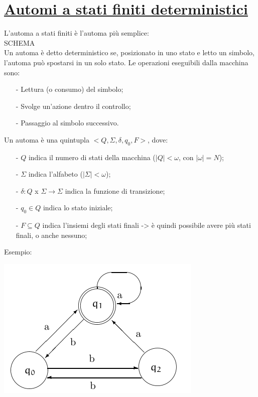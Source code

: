 \documentclass[a4paper, 10pt]{report}
\begin{document}
\section*{\underline{Automi a stati finiti deterministici}}
L'automa a stati finiti è l'automa più semplice:\\

SCHEMA\\

\noindent Un automa è detto deterministico se, posizionato in uno stato e letto un simbolo, l'automa può spostarsi in un solo stato. 
Le operazioni eseguibili dalla macchina sono:
\begin{itemize}
\item[-] Lettura (o consumo) del simbolo;
\item[-] Svolge un'azione dentro il controllo;
\item[-] Passaggio al simbolo successivo. 
\end{itemize}

\noindent Un automa è una quintupla $<Q, \Sigma, \delta, q_0, F>$, dove:
\begin{itemize}
\item[-] $Q$ indica il numero di stati della macchina ($|Q| < \omega$, con $|\omega| = N$);
\item[-] $\Sigma$ indica l'alfabeto ($ |\Sigma| < \omega$);
\item[-] $\delta: Q$ x $\Sigma \rightarrow \Sigma$ indica la funzione di transizione;
\item[-] $q_0 \in Q$ indica lo stato iniziale;
\item[-] $F \subseteq Q$ indica l'insiemi degli stati finali -> è quindi possibile avere più stati finali, o anche nessuno;
\end{itemize}

\noindent Esempio:\\

\begin{center}
\includegraphics[scale=1]{14ottobre01.pdf}
\end{center}
\end{document}
